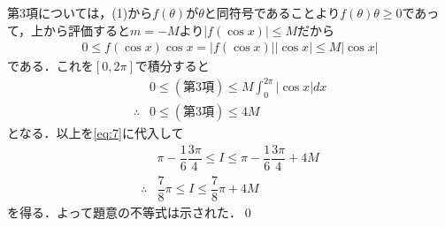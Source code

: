 \documentclass[../../main.tex]{subfiles}
\begin{document}
第3項については，(1)から$f(\theta)$が$\theta$と同符号であることより$f(\theta)\theta \ge 0$であって，上から評価すると$m=-M$より$|f(\cos x)| \le M$だから
\begin{align}
  0 \le f(\cos x)\cos x = |f(\cos x)||\cos x| \le M|\cos x|
\end{align}
である．これを$[0,2\pi]$で積分すると
\begin{align}
  & 0 \le (\text{第3項}) \le M \int_{0}^{2\pi} |\cos x| dx \\
  \therefore
  & 0 \le (\text{第3項}) \le 4M
\end{align}
となる．以上を\cref{eq:7}に代入して
\begin{align}
  & \pi-\dfrac{1}{6}\dfrac{3\pi}{4} \le I \le \pi-\dfrac{1}{6}\dfrac{3\pi}{4} + 4M \\
  \therefore
  &  \dfrac{7}{8}\pi \le I \le \dfrac{7}{8}\pi + 4M
\end{align}
を得る．よって題意の不等式は示された．\qed
\end{document}
